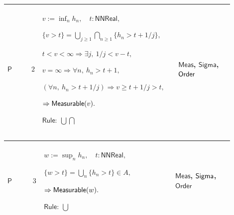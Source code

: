 \documentclass[12pt,reqno]{amsart}
\theoremstyle{blueplain}
\numberwithin{equation}{section}
\begin{document}
{\scriptsize \setlength{\parskip}{0pt}\nointerlineskip
\noindent 
\begin{tabular}{|@{}>{\centering\arraybackslash}m{0.10658\linewidth}|>{\centering\arraybackslash}m{0.03553\linewidth}|>{\centering\arraybackslash}m{0.52105\linewidth}|>{\centering\arraybackslash}m{0.23684\linewidth}|}
\hline
\hypertarget{proof:P2}{$\displaystyle \mathsf{P}$} & $\displaystyle 2$ & $%
\displaystyle v:=\inf_n h_n,\quad t:\mathsf{NNReal},$\par$\displaystyle %
\{v>t\}=\bigcup_{j\ge1}\bigcap_{n\ge1}\{h_n>t+1/j\},$\par$\displaystyle %
t<v<\infty\Rightarrow\exists j,\ 1/j<v-t,$\par$\displaystyle %
v=\infty\Rightarrow\forall n,\ h_n>t+1,$\par$\displaystyle (\forall n,\
h_n>t+1/j)\Rightarrow v\ge t+1/j>t,$\par$\displaystyle \Rightarrow\mathsf{%
Measurable}(v).$\par$\displaystyle \mathsf{Rule}:\ \bigcup\bigcap$ & 
\hyperlink{def:Meas}{$\displaystyle \mathsf{Meas}$}, \hyperlink{ax:Sigma}{$%
\displaystyle \mathsf{Sigma}$}, \hyperlink{ax:Order}{$\displaystyle \mathsf{%
Order}$} \\ \hline
\end{tabular}%
}

{\scriptsize \setlength{\parskip}{0pt}\nointerlineskip
\noindent 
\begin{tabular}{|@{}>{\centering\arraybackslash}m{0.10658\linewidth}|>{\centering\arraybackslash}m{0.03553\linewidth}|>{\centering\arraybackslash}m{0.52105\linewidth}|>{\centering\arraybackslash}m{0.23684\linewidth}|}
\hline
\hypertarget{proof:P3}{$\displaystyle \mathsf{P}$} & $\displaystyle 3$ & $%
\displaystyle w:=\sup_nh_n,\quad t:\mathsf{NNReal},$\par$\displaystyle %
\{w>t\}=\bigcup_n\{h_n>t\}\in A,$\par$\displaystyle \Rightarrow\mathsf{%
Measurable}(w).$\par$\displaystyle \mathsf{Rule}:\ \bigcup$ & \hyperlink{def:Meas}%
{$\displaystyle \mathsf{Meas}$}, \hyperlink{ax:Sigma}{$\displaystyle \mathsf{%
Sigma}$}, \hyperlink{ax:Order}{$\displaystyle \mathsf{Order}$} \\ \hline
\end{tabular}%
}
\end{document}
